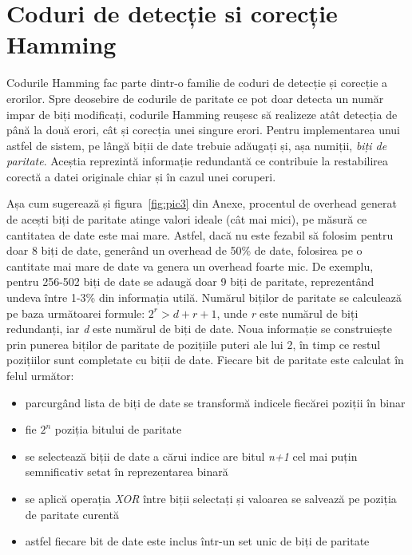 \documentclass[12pt,a4paper]{report}
\begin{document}
\section{Coduri de detecție si corecție Hamming} \label{hamming}

Codurile Hamming fac parte dintr-o familie de coduri de detecție și corecție a erorilor. Spre deosebire de codurile de paritate ce pot doar detecta un număr impar de biți modificați, codurile Hamming reușesc să realizeze atât detecția de până la două erori, cât și corecția unei singure erori. Pentru implementarea unui astfel de sistem, pe lângă biții de date trebuie adăugați și, așa numiții, \textit{biți de paritate}. Aceștia reprezintă informație redundantă ce contribuie la restabilirea corectă a datei originale chiar și în cazul unei coruperi.

Așa cum sugerează și figura~\ref{fig:pic3} din Anexe, procentul de overhead generat de acești biți de paritate atinge valori ideale (cât mai mici), pe măsură ce cantitatea de date este mai mare. Astfel, dacă nu este fezabil să folosim pentru doar 8 biți de date, generând un overhead de 50\% de date, folosirea pe o cantitate mai mare de date va genera un overhead foarte mic. De exemplu, pentru 256-502 biți de date se adaugă doar 9 biți de paritate, reprezentând undeva între 1-3\% din informația utilă. Numărul biților de paritate se calculează pe baza următoarei formule: $2^r > d + r + 1$, unde \textit{r} este numărul de biți redundanți, iar \textit{d} este numărul de biți de date. Noua informație se construiește prin punerea biților de paritate de pozițiile puteri ale lui 2, în timp ce restul pozițiilor sunt completate cu biții de date. Fiecare bit de paritate este calculat în felul următor:
\begin{itemize}
	\item parcurgând lista de biți de date se transformă indicele fiecărei poziții în binar
	\item fie $2^n$ poziția bitului de paritate
	\item se selectează biții de date a cărui indice are bitul \textit{n+1} cel mai puțin semnificativ setat în reprezentarea binară
	\item se aplică operația \textit{XOR} între biții selectați și valoarea se salvează pe poziția de paritate curentă
	\item astfel fiecare bit de date este inclus într-un set unic de biți de paritate
\end{itemize}
\end{document}
